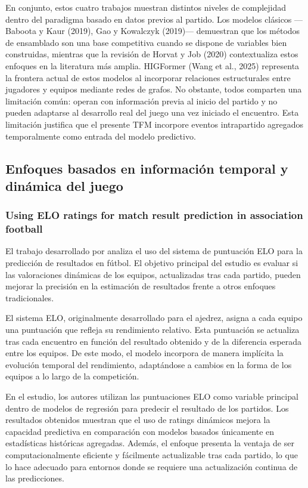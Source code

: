 En conjunto, estos cuatro trabajos muestran distintos niveles de complejidad dentro del paradigma basado en datos previos al partido. Los modelos clásicos —Baboota y Kaur (2019), Gao y Kowalczyk (2019)— demuestran que los métodos de ensamblado son una base competitiva cuando se dispone de variables bien construidas, mientras que la revisión de Horvat y Job (2020) contextualiza estos enfoques en la literatura más amplia. HIGFormer (Wang et al., 2025) representa la frontera actual de estos modelos al incorporar relaciones estructurales entre jugadores y equipos mediante redes de grafos. No obstante, todos comparten una limitación común: operan con información previa al inicio del partido y no pueden adaptarse al desarrollo real del juego una vez iniciado el encuentro. Esta limitación justifica que el presente TFM incorpore eventos intrapartido agregados temporalmente como entrada del modelo predictivo.

\subsection{Enfoques basados en información temporal y dinámica del juego}

\subsubsection{Using ELO ratings for match result prediction in association football}

El trabajo desarrollado por \cite{hvattum2010elo} analiza el uso del sistema de puntuación ELO para la predicción de resultados en fútbol. El objetivo principal del estudio es evaluar si las valoraciones dinámicas de los equipos, actualizadas tras cada partido, pueden mejorar la precisión en la estimación de resultados frente a otros enfoques tradicionales.

El sistema ELO, originalmente desarrollado para el ajedrez, asigna a cada equipo una puntuación que refleja su rendimiento relativo. Esta puntuación se actualiza tras cada encuentro en función del resultado obtenido y de la diferencia esperada entre los equipos. De este modo, el modelo incorpora de manera implícita la evolución temporal del rendimiento, adaptándose a cambios en la forma de los equipos a lo largo de la competición.

En el estudio, los autores utilizan las puntuaciones ELO como variable principal dentro de modelos de regresión para predecir el resultado de los partidos. Los resultados obtenidos muestran que el uso de ratings dinámicos mejora la capacidad predictiva en comparación con modelos basados únicamente en estadísticas históricas agregadas. Además, el enfoque presenta la ventaja de ser computacionalmente eficiente y fácilmente actualizable tras cada partido, lo que lo hace adecuado para entornos donde se requiere una actualización continua de las predicciones.

